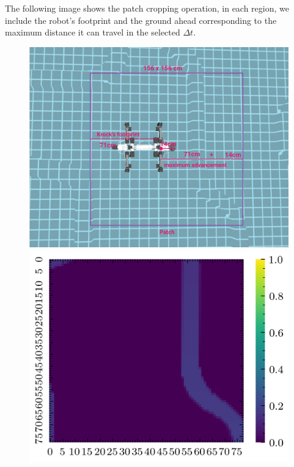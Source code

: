 \documentclass[twocolumn,showpacs,
  nofootinbib,aps,superscriptaddress,
  eqsecnum,prd,notitlepage,showkeys,10pt]{revtex4-1}
\begin{document}
The following image shows the patch cropping operation, in each region, we include the robot's footprint and the ground ahead corresponding to the maximum distance it can travel in the selected $\Delta t$.
\begin{figure}[H]
  \centering
      \includegraphics[width=\linewidth]{images/crop/crop.png}
      \begin{minipage}[t]{0.4\linewidth}
      \includegraphics[width=\linewidth]{images/crop/test-1-2d.png}
    \end{minipage}
      \begin{minipage}[t]{0.4\linewidth}

\end{minipage}
\end{figure}
\end{document}
